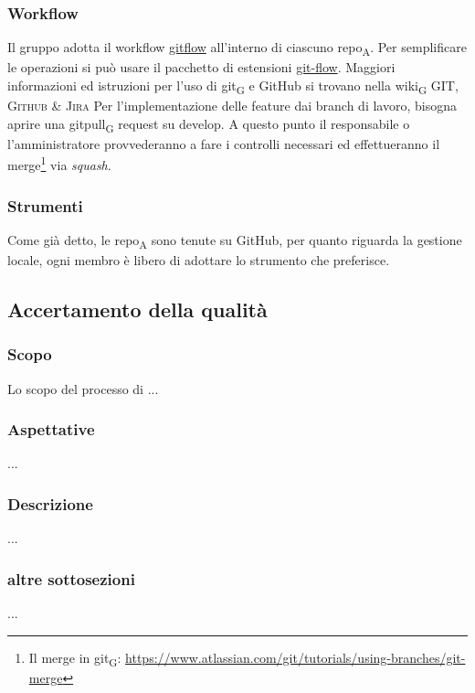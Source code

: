     \subsubsection{Workflow}
        Il gruppo adotta il workflow \href{https://www.atlassian.com/git/tutorials/comparing-workflows/gitflow-workflow}{gitflow} all'interno di ciascuno \acrshort{repo}\textsubscript{A}. Per semplificare le operazioni si può usare il pacchetto di estensioni \href{http://danielkummer.github.io/git-flow-cheatsheet/}{git-flow}. Maggiori informazioni ed istruzioni per l'uso di \gls{git}\textsubscript{G} e GitHub si trovano nella \gls{wiki}\textsubscript{G} \textsc{GIT, Github \& Jira}
            Per l'implementazione delle feature dai branch di lavoro, bisogna aprire una \gls{gitpull}\textsubscript{G} request su develop. A questo punto il responsabile o l'amministratore provvederanno a fare i controlli necessari ed effettueranno il merge\footnote{Il merge in \gls{git}\textsubscript{G}: \url{https://www.atlassian.com/git/tutorials/using-branches/git-merge}} via \textit{squash}.

    \subsubsection{Strumenti}
        Come già detto, le \acrshort{repo}\textsubscript{A} sono tenute su GitHub, per quanto riguarda la gestione locale, ogni membro è libero di adottare lo strumento che preferisce.

\subsection{Accertamento della qualità} %
    \subsubsection{Scopo}
        Lo scopo del processo di ...
    \subsubsection{Aspettative}
        ...
    \subsubsection{Descrizione}
        ...
    \subsubsection{altre sottosezioni}
        ...

